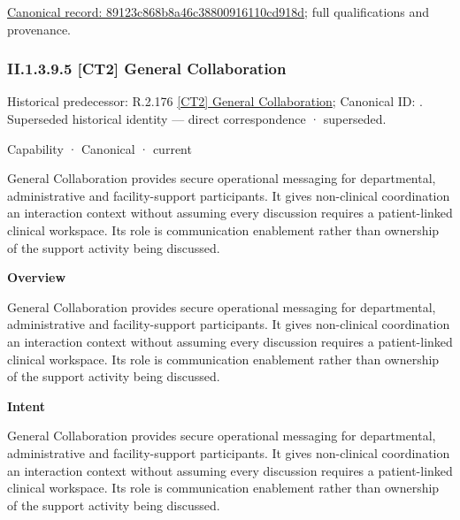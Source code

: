 {\footnotesize \href{../../../../continuum/strategy/capability/feature/89123c868b8a46c38800916110cd918d.md}{Canonical record: 89123c868b8a46c38800916110cd918d}; full qualifications and provenance.}\par
\subsubsection*{II.1.3.9.5 [CT2] General Collaboration}
\label{navigation:II.1.3.9.5}

{\small Historical predecessor: R.2.176 \hyperref[element:4f58c82aca7a4b54aeb6e2920ce5c12a]{[CT2] General Collaboration}; Canonical ID: \texttt{}. Superseded historical identity — direct correspondence · superseded.}\par
\label{element:3bb740e6db284112b054905c0c6c80be}
{\small Capability · Canonical · current}\par

General Collaboration provides secure operational messaging for departmental, administrative and facility-support participants. It gives non-clinical coordination an interaction context without assuming every discussion requires a patient-linked clinical workspace. Its role is communication enablement rather than ownership of the support activity being discussed.



\textbf{Overview}



General Collaboration provides secure operational messaging for departmental, administrative and facility-support participants. It gives non-clinical coordination an interaction context without assuming every discussion requires a patient-linked clinical workspace. Its role is communication enablement rather than ownership of the support activity being discussed.



\textbf{Intent}



General Collaboration provides secure operational messaging for departmental, administrative and facility-support participants. It gives non-clinical coordination an interaction context without assuming every discussion requires a patient-linked clinical workspace. Its role is communication enablement rather than ownership of the support activity being discussed.




